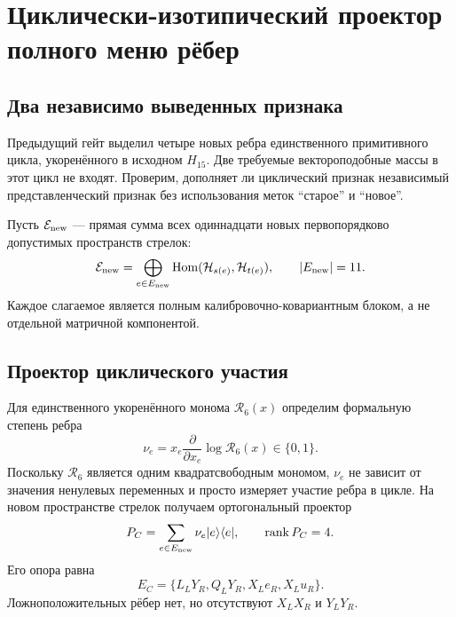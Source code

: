 \chapter{Циклически-изотипический проектор полного меню рёбер}
\label{ch:v7-rooted-cycle-isotypic-edge-projector-gate}

\section{Два независимо выведенных признака}

Предыдущий гейт выделил четыре новых ребра единственного примитивного цикла,
укоренённого в исходном $H_{15}$. Две требуемые вектороподобные массы в этот
цикл не входят. Проверим, дополняет ли циклический признак независимый
представленческий признак без использования меток ``старое'' и ``новое''.

Пусть $\mathcal E_{\rm new}$ --- прямая сумма всех одиннадцати новых
первопорядково допустимых пространств стрелок:
\begin{equation}
 \mathcal E_{\rm new}
 =\bigoplus_{e\in E_{\rm new}}
 \operatorname{Hom}(\mathcal H_{s(e)},\mathcal H_{t(e)}),
 \qquad |E_{\rm new}|=11.
 \label{eq:v7-edge-projector-space}
\end{equation}
Каждое слагаемое является полным калибровочно-ковариантным блоком, а не
отдельной матричной компонентой.

\section{Проектор циклического участия}

Для единственного укоренённого монома $\mathcal R_6(x)$ определим формальную
степень ребра
\begin{equation}
 \nu_e=x_e\frac{\partial}{\partial x_e}\log\mathcal R_6(x)
 \in\{0,1\}.
 \label{eq:v7-edge-projector-cycle-degree}
\end{equation}
Поскольку $\mathcal R_6$ является одним квадратсвободным мономом, $\nu_e$
не зависит от значения ненулевых переменных и просто измеряет участие ребра
в цикле. На новом пространстве стрелок получаем ортогональный проектор
\begin{equation}
 P_C=\sum_{e\in E_{\rm new}}\nu_e|e\rangle\langle e|,
 \qquad \operatorname{rank} P_C=4.
 \label{eq:v7-edge-projector-cycle}
\end{equation}
Его опора равна
\begin{equation}
 E_C=\{L_LY_R,Q_LY_R,X_Le_R,X_Lu_R\}.
 \label{eq:v7-edge-projector-cycle-support}
\end{equation}
Ложноположительных рёбер нет, но отсутствуют $X_LX_R$ и $Y_LY_R$.

